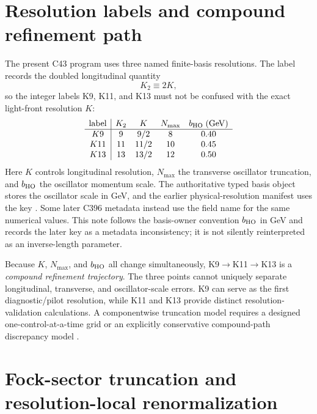 \documentclass[11pt,oneside]{book}
\newcommand{\GeV}{\mathrm{GeV}}
\newcommand{\statuscode}[1]{\text{\ttfamily\detokenize{#1}}}
\begin{document}
\section{Resolution labels and compound refinement path}

The present C43 program uses three named finite-basis resolutions.  The label records the doubled longitudinal quantity
\begin{equation}
 K_2\equiv 2K,
 \label{eq:K2-definition}
\end{equation}
so the integer labels K9, K11, and K13 must not be confused with the exact light-front resolution $K$:
\begin{equation}
 \begin{array}{c|cccc}
 \text{label}&K_2&K&N_{\max}&b_{\rm HO}\;(\GeV)\\\hline
 K9&9&9/2&8&0.40\\
 K11&11&11/2&10&0.45\\
 K13&13&13/2&12&0.50
 \end{array}
 \label{eq:resolution-table}
\end{equation}
Here $K$ controls longitudinal resolution, $N_{\max}$ the transverse oscillator truncation, and $b_{\rm HO}$ the oscillator momentum scale.  The authoritative typed basis object stores the oscillator scale in GeV, and the earlier physical-resolution manifest uses the key \statuscode{bHO_GeV}.  Some later C396 metadata instead use the field name \statuscode{bHO_GeVinv} for the same numerical values.  This note follows the basis-owner convention $b_{\rm HO}$ in GeV and records the later key as a metadata inconsistency; it is not silently reinterpreted as an inverse-length parameter.

Because $K$, $N_{\max}$, and $b_{\rm HO}$ all change simultaneously, K9$\to$K11$\to$K13 is a \emph{compound refinement trajectory}.  The three points cannot uniquely separate longitudinal, transverse, and oscillator-scale errors.  K9 can serve as the first diagnostic/pilot resolution, while K11 and K13 provide distinct resolution-validation calculations.  A componentwise truncation model requires a designed one-control-at-a-time grid or an explicitly conservative compound-path discrepancy model \cite{DWC400ScienceLock2026,DWC400S2Record2026}.

\section{Fock-sector truncation and resolution-local renormalization}
\end{document}
